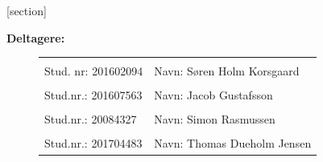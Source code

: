 [section]\setcounter{konstboks}{0}
\renewcommand{\thekonstboks}{\arabic{section}.\arabic{konstboks}}
\newenvironment{konstboks}[2][]{%
  \refstepcounter{konstboks}%
  \ifstrempty{#1}%
  {\mdfsetup{%
      frametitle={%
        \tikz[baseline=(current bounding box.east),outer sep=0pt]
        \node[anchor=east,rectangle,fill=green!20]
        {\strut Konstanter~\thekonstboks};}}
  }%
  {\mdfsetup{%
      frametitle={%
        \tikz[baseline=(current bounding box.east),outer sep=0pt]
        \node[anchor=east,rectangle,fill=green!20]
        {\strut Konstanter~\thekonstboks:~#1};}}%
  }%
  \mdfsetup{innertopmargin=10pt,linecolor=green!20,%
    linewidth=2pt,topline=true,%
    frametitleaboveskip=\dimexpr-\ht\strutbox\relax
  }
  \begin{mdframed}[]\relax%
    \label{#2}}{\end{mdframed}}
\mydata
\maketitle
\thispagestyle{empty}

\textbf{Deltagere:}
\begin{figure}[h]
  \centering
  \begin{tabular}{|p{5cm}p{10cm}|}
    \hline
    &\\
    Stud. nr: 201602094 & Navn: Søren Holm Korsgaard \\
    \hline
    &\\
    Stud.nr.: 201607563 & Navn: Jacob Gustafsson \\
    \hline
    &\\
    Stud.nr.: 20084327 & Navn: Simon Rasmussen \\
    \hline
    &\\
    Stud.nr.: 201704483 & Navn: Thomas Dueholm Jensen \\
    \hline
  \end{tabular}

\end{figure}
\vspace{-5mm}
\setcounter{tocdepth}{2}
\tableofcontents
\thispagestyle{empty}
\newpage
\setcounter{page}{1}

